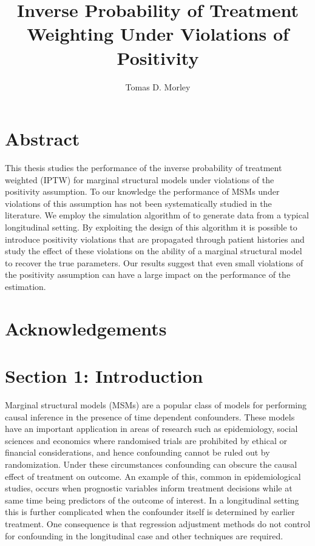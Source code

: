 \documentclass[11pt]{article}
\title{Inverse Probability of Treatment Weighting Under Violations of Positivity}
\author{Tomas D. Morley}
\begin{document}
    
    
    \maketitle
    
    

    
    \newpage

\section{Abstract}\label{abstract}

This thesis studies the performance of the inverse probability of
treatment weighted (IPTW) for marginal structural models under
violations of the positivity assumption. To our knowledge the
performance of MSMs under violations of this assumption has not been
systematically studied in the literature. We employ the simulation
algorithm of \citet{Havercroft2012} to generate data from a typical
longitudinal setting. By exploiting the design of this algorithm it is
possible to introduce positivity violations that are propagated through
patient histories and study the effect of these violations on the
ability of a marginal structural model to recover the true parameters.
Our results suggest that even small violations of the positivity
assumption can have a large impact on the performance of the estimation.

    \newpage

\section{Acknowledgements}\label{acknowledgements}

    \newpage

\tableofcontents{}

    \newpage

\section{Section 1: Introduction}\label{section-1-introduction}

Marginal structural models (MSMs) are a popular class of models for
performing causal inference in the presence of time dependent
confounders. These models have an important application in areas of
research such as epidemiology, social sciences and economics where
randomised trials are prohibited by ethical or financial considerations,
and hence confounding cannot be ruled out by randomization. Under these
circumstances confounding can obscure the causal effect of treatment on
outcome. An example of this, common in epidemiological studies, occurs
when prognostic variables inform treatment decisions while at same time
being predictors of the outcome of interest. In a longitudinal setting
this is further complicated when the confounder itself is determined by
earlier treatment. One consequence is that regression adjustment methods
do not control for confounding in the longitudinal case and other
techniques are required.
\end{document}
